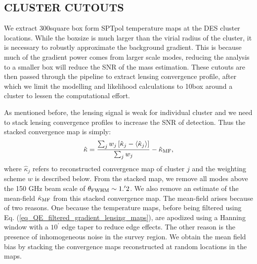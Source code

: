  \subsection{CLUSTER CUTOUTS} %
 

 
\label{sec:cluster_cutouts}
 We extract 300\arcmin square box form SPTpol temperature maps at the DES cluster locations. 
While the boxsize is much larger than the virial radius of the cluster, it is necessary to robustly approximate the background gradient. 
This is because much of the gradient power comes from larger scale modes, reducing the analysis to a smaller box will reduce the SNR of the mass estimation. 
These cutouts are then passed through the pipeline to extract lensing convergence profile, after which we limit the modelling and likelihood calculations to 10\arcmin box around a cluster to lessen the computational effort.

As mentioned before, the lensing signal is weak for individual cluster and we need to stack lensing convergence profiles to increase the SNR of detection.
 Thus the stacked convergence map is simply: 
 \begin{equation}
 \hat{\kappa} = \frac{\sum_j  w_j \left[ \hat{\kappa}_{j} - \left< \hat{\kappa}_{j} \right> \right]}{\sum_j w_j} - \hat{\kappa}_{\rm MF},
 \end{equation}
 where $\hat{\kappa}_{j}$ refers to reconstructed convergence map of cluster $j$ %
 and the weighting scheme $w$ is described below.
From the stacked map, we remove all modes above the \sptpol{} 150 GHz beam scale of $\theta_{\rm FWHM}\sim 1.^{\prime}2$. 
We also remove an estimate of the mean-field $\hat{\kappa}_{\rm MF}$ from this stacked convergence map.
The mean-field arises because of two reasons.
One because the temperature maps, before being filtered using Eq. (\ref{eq_QE_filtered_gradient_lensing_maps}), are apodized using a Hanning window with a $10^{\prime}$ edge taper to reduce edge effects.
The other reason is the presence of inhomogeneous noise in the survey region.
We obtain the mean field bias by stacking the convergence maps reconstructed at \howmanyrandomsforMF{} random locations in the maps. 


